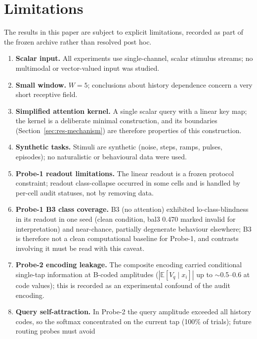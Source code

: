 \section{Limitations}\label{sec:limitations}

The results in this paper are subject to explicit limitations, recorded
as part of the frozen archive rather than resolved post hoc.

\begin{enumerate}
  \item \textbf{Scalar input.}  All experiments use single-channel,
    scalar stimulus streams; no multimodal or vector-valued input was
    studied.
  \item \textbf{Small window.}  $W = 5$; conclusions about
    history dependence concern a very short receptive field.
  \item \textbf{Simplified attention kernel.}  A single scalar query with
    a linear key map; the kernel is a deliberate minimal construction,
    and its boundaries (Section~\ref{sec:res-mechanism}) are therefore
    properties of this construction.
  \item \textbf{Synthetic tasks.}  Stimuli are synthetic (noise, steps,
    ramps, pulses, episodes); no naturalistic or behavioural data were
    used.
  \item \textbf{Probe-1 readout limitations.}  The linear readout is a
    frozen protocol constraint; readout class-collapse occurred in some
    cells and is handled by per-cell audit statuses, not by removing
    data.
  \item \textbf{Probe-1 B3 class coverage.}  B3 (no attention) exhibited
    lo-class-blindness in its readout in one seed (clean condition,
    bal3 0.470 marked invalid for interpretation) and near-chance,
    partially degenerate behaviour elsewhere; B3 is therefore not a clean
    computational baseline for Probe-1, and contrasts involving it must
    be read with this caveat.
  \item \textbf{Probe-2 encoding leakage.}  The composite encoding
    carried conditional single-tap information at B-coded amplitudes
    ($|\mathbb{E}[V_q \mid x_i]|$ up to $\sim$0.5--0.6 at code values);
    this is recorded as an experimental confound of the audit encoding.
  \item \textbf{Query self-attraction.}  In Probe-2 the query amplitude
    exceeded all history codes, so the softmax concentrated on the
    current tap (100\% of trials); future routing probes must avoid

\end{enumerate}
